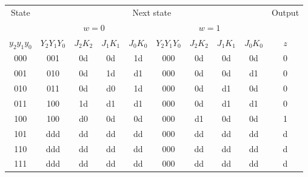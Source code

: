 \documentclass[10pt,a4paper]{scrartcl}
\begin{document}
\begin{tabular}{|c||c|c|c|c||c|c|c|c||c|}

  \hline
  State     & \multicolumn{8}{c||}{Next state}             & \multicolumn{1}{c|}{Output} \\
            & \multicolumn{4}{c||}{$w=0$}                  & \multicolumn{4}{c||}{$w=1$}                  &  \\
$y_2y_1y_0$ & $Y_2Y_1Y_0$ & $J_2K_2$ & $J_1K_1$ & $J_0K_0$ & $Y_2Y_1Y_0$ & $J_2K_2$ & $J_1K_1$ & $J_0K_0$ & $z$  \\ \hline\hline
  000       & 001         & 0d       & 0d       & 1d       & 000         & 0d       & 0d       & 0d       & 0    \\ \hline  
  001       & 010         & 0d       & 1d       & d1       & 000         & 0d       & 0d       & d1       & 0    \\ \hline  
  010       & 011         & 0d       & d0       & 1d       & 000         & 0d       & d1       & 0d       & 0    \\ \hline  
  011       & 100         & 1d       & d1       & d1       & 000         & 0d       & d1       & d1       & 0    \\ \hline  
  100       & 100         & d0       & 0d       & 0d       & 000         & d1       & 0d       & 0d       & 1    \\ \hline \hline  
  101       & ddd         & dd       & dd       & dd       & 000         & dd       & dd       & dd       & d    \\ \hline  
  110       & ddd         & dd       & dd       & dd       & 000         & dd       & dd       & dd       & d    \\ \hline  
  111       & ddd         & dd       & dd       & dd       & 000         & dd       & dd       & dd       & d    \\ \hline  
\end{tabular}
\end{document}

